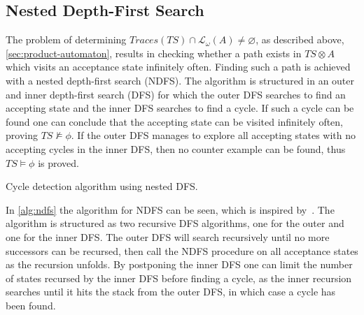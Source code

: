 \subsection{Nested Depth-First Search}\label{sec:methods-ndfs}
The problem of determining $Traces(TS) \cap \mathcal{L_\omega}(A) \neq \varnothing$, as described above, \autoref{sec:product-automaton}, results in checking whether a path exists in $TS \otimes A$ which visits an acceptance state infinitely often. Finding such a path is achieved with a nested depth-first search (NDFS). The algorithm is structured in an outer and inner depth-first search (DFS) for which the outer DFS searches to find an accepting state and the inner DFS searches to find a cycle. If such a cycle can be found one can conclude that the accepting state can be visited infinitely often, proving $TS \not\models \phi$. If the outer DFS manages to explore all accepting states with no accepting cycles in the inner DFS, then no counter example can be found, thus $TS \models \phi$ is proved.
\begin{algorithm}[H]
\SetAlgoLined
\DontPrintSemicolon
{}
\;

\caption{Cycle detection algorithm using nested DFS.}
\label{alg:ndfs}
\end{algorithm}
In \autoref{alg:ndfs} the algorithm for NDFS can be seen, which is inspired by~\cite[Fig.~4]{holzmann1996nested}. The algorithm is structured as two recursive DFS algorithms, one for the outer and one for the inner DFS. The outer DFS will search recursively until no more successors can be recursed, then call the NDFS procedure on all acceptance states as the recursion unfolds. By postponing the inner DFS one can limit the number of states recursed by the inner DFS before finding a cycle, as the inner recursion searches until it hits the stack from the outer DFS, in which case a cycle has been found.